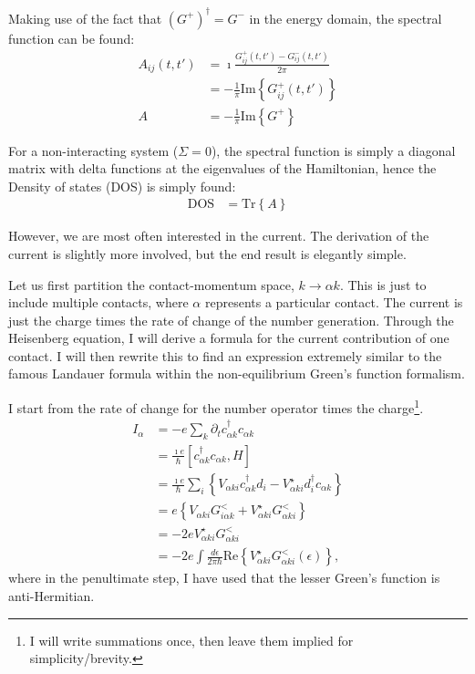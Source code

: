 Making use of the fact that $\left(G^+\right)^\dagger = G^-$ in the energy domain, the spectral function can be found:
\begin{align*}
A_{ij}(t, t') &= \imath \frac{G^+_{ij}(t, t') - G^-_{ij}(t, t')}{2\pi}\\
&= - \frac{1}{\pi} \text{Im}\left\{ G^+_{ij}(t, t')\right\} \\
A &=- \frac{1}{\pi} \text{Im}\left\{ G^+\right\}
\end{align*}

For a non-interacting system ($\Sigma=0$), the spectral function is simply a diagonal matrix with delta functions at the eigenvalues of the Hamiltonian, hence the Density of states (DOS) is simply found:
\begin{align}
\text{DOS} &= \text{Tr}\left\{A\right\}
\label{eq:dos}
\end{align}


However, we are most often interested in the current. The derivation of the current is slightly more involved, but the end result is elegantly simple.

Let us first partition the contact-momentum space, $k \rightarrow \alpha k$. This is just to include multiple contacts, where $\alpha$ represents a particular contact.  The current is just the charge times the rate of change of the number generation. Through the Heisenberg equation, I will derive a formula for the current contribution of one contact. I will then rewrite this to find an expression extremely similar to the famous Landauer formula within the non-equilibrium Green's function formalism.

I start from the rate of change for the number operator times the charge\footnote{I will write summations once, then leave them implied for simplicity/brevity.}.  
\begin{align*}
I_\alpha &= - e \sum_{k} \partial_t c^\dagger_{\alpha k} c_{\alpha k} \\
&= \frac{\imath e}{\hbar} \left[ c^\dagger_{\alpha k} c_{\alpha k}, H\right] \\
&= \frac{\imath e}{\hbar}\sum_i \left\{ V_{\alpha ki} c^\dagger_{\alpha k} d_i - V^\star_{\alpha ki} d_i^\dagger c_{\alpha k}\right\} \\
&= e \left\{ V_{\alpha ki} G^<_{i\alpha k} + V_{\alpha ki}^\star G^<_{\alpha ki}\right\}\\
&= -2e V^\star_{\alpha ki}G^<_{\alpha ki} \\
&= -2e \int \frac{d\epsilon}{2\pi\hbar} \text{Re}\left\{ V^\star_{\alpha ki} G^<_{\alpha ki} (\epsilon) \right\},
\end{align*}
where in the penultimate step, I have used that the lesser Green's function is anti-Hermitian. 

